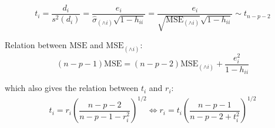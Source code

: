 \begin{itemize}[topsep=2pt,itemsep=2pt]
    \begin{equation}
         t_i=\dfrac{d_i}{s^2(d_i)}=\dfrac{e_i}{\hat{\sigma} _{(\wedge i)}\sqrt{1-h_{ii}}}= \dfrac{e_i}{\sqrt{\mathrm{MSE}_{(\wedge i)} }\sqrt{1-h_{ii}}}\sim t_{n-p-2}
    \end{equation}

    Relation between $ \mathrm{MSE}  $ and $ \mathrm{MSE}_{(\wedge i)}  $:
    \begin{equation}
        (n-p-1)\mathrm{MSE}=(n-p-2)\mathrm{MSE}_{(\wedge i)}+\dfrac{e_i^2}{1-h_{ii}}   
    \end{equation}

    which also gives the relation between $ t_i $ and $ r_i $:
    \begin{align}
        t_i=r_i\left(\dfrac{n-p-2}{n-p-1-r_i^2}\right)^{1/2}\Leftrightarrow r_i=t_i\left(\dfrac{n-p-1}{n-p-2+t_i^2}\right)^{1/2} 
    \end{align}
    
\end{itemize}


